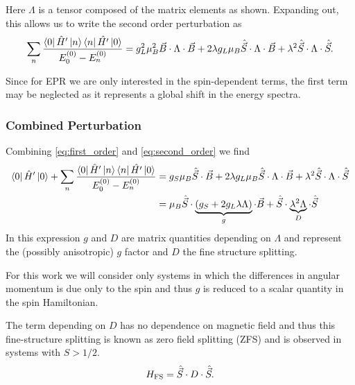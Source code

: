 Here $\Lambda$ is a tensor composed of the matrix elements as shown. Expanding out, this allows us to write the second order perturbation as 
\begin{equation}
    \sum_{n}\frac{\bra{0} \hat{H}' \ket{n} \bra{n} \hat{H'}\ket{0}}{E_0^{(0)} - E_n^{(0)}} = g_L^2\mu_B^2 \vec{B} \cdot \Lambda \cdot \vec{B} + 2\lambda g_L\mu_B\hat{\vec{S}}\cdot\Lambda\cdot\vec{B} + \lambda^2 \hat{\vec{S}}\cdot \Lambda \cdot \hat{\vec{S}}.
    \label{eq:second_order}
\end{equation}

Since for EPR we are only interested in the spin-dependent terms, the first term may be neglected as it represents a global shift in the energy spectra. 

\subsubsection{Combined Perturbation}
Combining \ref{eq:first_order} and \ref{eq:second_order} we find 
\begin{equation}
    \begin{align}
    \bra{0} \hat{H}' \ket{0}+  \sum_{n}\frac{\bra{0} \hat{H}' \ket{n} \bra{n} \hat{H'}\ket{0}}{E_0^{(0)} - E_n^{(0)}}
    &= g_S \mu_B \hat{\vec{S}} \cdot \vec{B} + 2\lambda g_L\mu_B\hat{\vec{S}}\cdot\Lambda\cdot\vec{B} + \lambda^2 \hat{\vec{S}}\cdot \Lambda \cdot \hat{\vec{S}} \\ 
    &=\mu_B \hat{\vec{S}} \cdot \underbrace{(g_S + 2g_L \lambda \Lambda)}_{g} \cdot \vec{B} + \hat{\vec{S}}\cdot \underbrace{\lambda^2 \Lambda}_{D} \cdot \hat{\vec{S}}
    \end{align}
    \label{eq:}
\end{equation}
In this expression $g$ and $D$ are matrix quantities depending on $\Lambda$ and represent the (possibly anisotropic) $g$ factor and $D$ the fine structure splitting. 

For this work we will consider only systems in which the differences in angular momentum is due only to the spin and thus $g$ is reduced to a scalar quantity in the spin Hamiltonian. 

The term depending on $D$ has no dependence on magnetic field and thus this fine-structure splitting is known as zero field splitting (ZFS) and is observed in systems with $S > 1/2$. 
\begin{equation}
    H_{\ce{FS}} = \hat{\vec{S}}\cdot D \cdot \hat{\vec{S}}. 
    \label{eq:fine_structure}
\end{equation}







